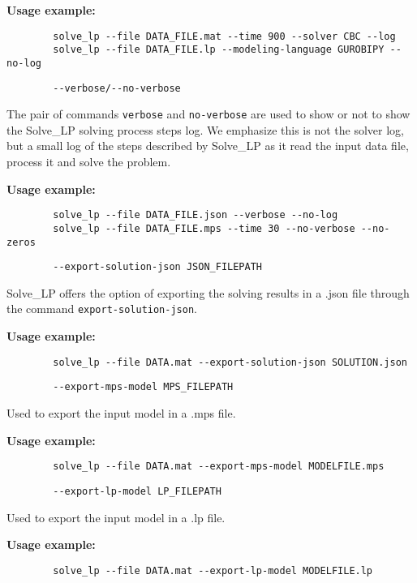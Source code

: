 \documentclass[12pt,hidelinks]{article}
\begin{document}
	\textbf{Usage example:} 
	\begin{verbatim}
		solve_lp --file DATA_FILE.mat --time 900 --solver CBC --log
		solve_lp --file DATA_FILE.lp --modeling-language GUROBIPY --no-log
	\end{verbatim}

	{\color{mordantred19}
	\begin{verbatim}
		--verbose/--no-verbose
	\end{verbatim}
	} The pair of commands \texttt{verbose} and \texttt{no-verbose} are used to show or not to show the Solve\_LP solving process steps log. We emphasize this is not the solver log, but a small log of the steps described by Solve\_LP as it read the input data file, process it and solve the problem.
	
	\textbf{Usage example:} 
	\begin{verbatim}
		solve_lp --file DATA_FILE.json --verbose --no-log
		solve_lp --file DATA_FILE.mps --time 30 --no-verbose --no-zeros
	\end{verbatim}

	{\color{mordantred19}
	\begin{verbatim}
		--export-solution-json JSON_FILEPATH
	\end{verbatim}
	} Solve\_LP offers the option of exporting the solving results in a .json file through the command \texttt{export-solution-json}.
	
	\textbf{Usage example:} 
	\begin{verbatim}
		solve_lp --file DATA.mat --export-solution-json SOLUTION.json
	\end{verbatim}

	{\color{mordantred19}
	\begin{verbatim}
		--export-mps-model MPS_FILEPATH
	\end{verbatim}
	} Used to export the input model in a .mps file.
	
	\textbf{Usage example:} 
	\begin{verbatim}
		solve_lp --file DATA.mat --export-mps-model MODELFILE.mps
	\end{verbatim}

	{\color{mordantred19}
	\begin{verbatim}
		--export-lp-model LP_FILEPATH
	\end{verbatim}
	} Used to export the input model in a .lp file.
	
	\textbf{Usage example:} 
	\begin{verbatim}
		solve_lp --file DATA.mat --export-lp-model MODELFILE.lp
	\end{verbatim}
\end{document}
